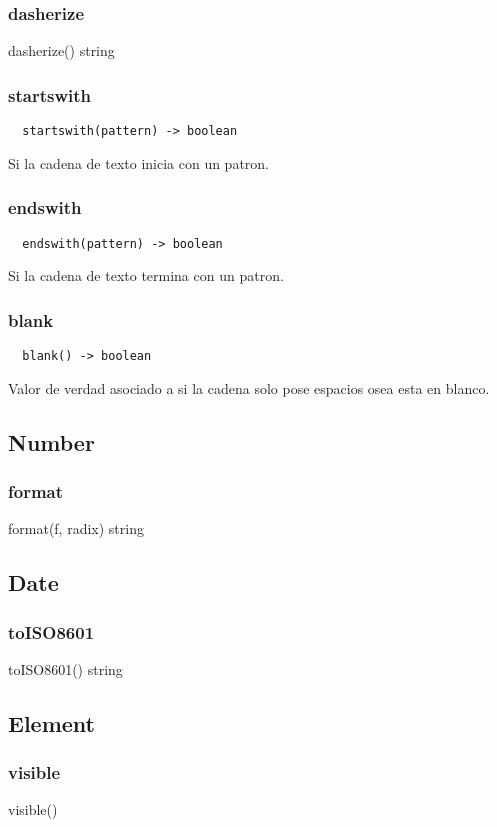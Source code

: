 {{\subsubsection*{dasherize}
dasherize() \rightarrow string
\subsubsection*{startswith}
\begin{verbatim}
  startswith(pattern) -> boolean
\end{verbatim}
Si la cadena de texto inicia con un patron.

\subsubsection*{endswith}
\begin{verbatim}
  endswith(pattern) -> boolean
\end{verbatim}
Si la cadena de texto termina con un patron.

\subsubsection*{blank}
\begin{verbatim}
  blank() -> boolean
\end{verbatim}
Valor de verdad asociado a si la cadena solo pose espacios osea esta en blanco.

\subsection{Number}
\subsubsection*{format}
format(f, radix) \rightarrow string

\subsection{Date}
\subsubsection*{toISO8601}
toISO8601() \rightarrow string

\subsection{Element}
\subsubsection*{visible}
visible()
}}
